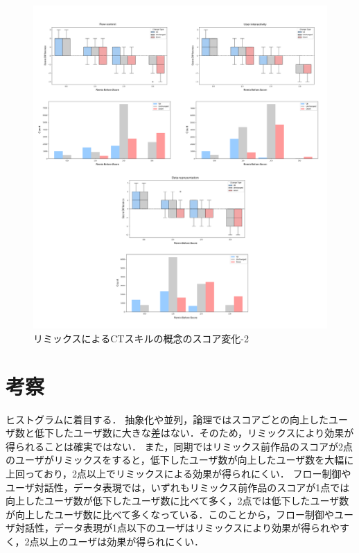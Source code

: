 \documentclass[11pt]{jreport}
\begin{document}
\begin{figure}[h]
\centerline{\includegraphics[width=1.2\linewidth]{@BSthesis2024_Horio/BSthesis2024_Horio_fig/rq2-2.pdf}}
\caption{リミックスによるCTスキルの概念のスコア変化-2}
\label{fig:rq2-2}
\end{figure}

\section{考察}
ヒストグラムに着目する．
抽象化や並列，論理ではスコアごとの向上したユーザ数と低下したユーザ数に大きな差はない．そのため，リミックスにより効果が得られることは確実ではない．
また，同期ではリミックス前作品のスコアが2点のユーザがリミックスをすると，低下したユーザ数が向上したユーザ数を大幅に上回っており，2点以上でリミックスによる効果が得られにくい．
フロー制御やユーザ対話性，データ表現では，いずれもリミックス前作品のスコアが1点では向上したユーザ数が低下したユーザ数に比べて多く，2点では低下したユーザ数が向上したユーザ数に比べて多くなっている．このことから，フロー制御やユーザ対話性，データ表現が1点以下のユーザはリミックスにより効果が得られやすく，2点以上のユーザは効果が得られにくい．
\end{document}
